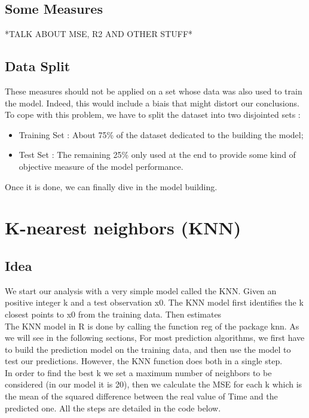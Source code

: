 \documentclass[]{report}
\begin{document}
\subsection{Some Measures}
*TALK ABOUT MSE, R2 AND OTHER STUFF*

\subsection{Data Split}
These measures should not be applied on a set whose data was also used to train the model. Indeed, this would include a biais that might distort our conclusions. To cope with this problem, we have to split the dataset into two disjointed sets : 
\begin{itemize}
	\item Training Set : About 75\% of the dataset dedicated to the building the model;
	\item Test Set : The remaining 25\% only used at the end to provide some kind of objective measure of the model performance.
\end{itemize} 

Once it is done, we can finally dive in the model building.

\section{K-nearest neighbors (KNN)}
\subsection{Idea}
We start our analysis with a very simple model called the KNN.
Given an positive integer k and a test observation x0. The KNN model first identifies the k closest points to x0 from the training data. Then estimates \\ 

The KNN model in R is done by calling the function reg of the package knn. As we will see in the following sections, For most prediction algorithms, we first have to build the prediction model on the training data, and then use the model to test our predictions. However, the KNN function does both in a single step.\\ 
In order to find the best k we set a maximum number of neighbors to be considered (in our model it is 20), then we calculate the MSE for each k which is the mean of the squared difference between the real value of Time and the predicted one. All the steps are detailed in the code below.\\
\end{document}

